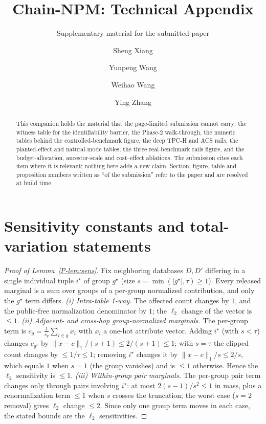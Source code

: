 \documentclass[sigconf, nonacm]{acmart}
\title{Chain-NPM: Technical Appendix}
\subtitle{Supplementary material for the submitted paper}
\author{Sheng Xiang}
\affiliation{%
  \institution{Tongji University}
}
\author{Yunpeng Wang}
\affiliation{%
  \institution{Tongji University}
}
\author{Weihao Wang}
\affiliation{%
  \institution{Tongji University}
}
\author{Ying Zhang}
\affiliation{%
  \institution{Zhejiang Gongshang University}
}
\newcommand{\pref}[1]{\ref{P-#1}}
\begin{document}
\begin{abstract}
This companion holds the material that the page-limited submission cannot
carry: the witness table for the identifiability barrier, the Phase-2
walk-through, the numeric tables behind the controlled-benchmark figure, the
deep TPC-H and ACS rails, the planted-effect and natural-mode tables, the
three real-benchmark rails figure, and the budget-allocation, ancestor-scale
and cost--effect ablations.  The submission cites each item where it is
relevant; nothing here adds a new claim.  Section, figure, table and
proposition numbers written as ``of the submission'' refer to the paper and
are resolved at build time.
\end{abstract}

\maketitle

\section{Sensitivity constants and total-variation statements}
\label{app:proofs}

\begin{proof}[Proof of Lemma~\pref{lem:sens}]
Fix neighboring databases $D,D'$ differing in a single individual tuple
$i^\star$ of group $g^\star$ (size $s=\min(|g^\star|,\tau)\ge1$). Every
released marginal is a sum over groups of a per-group normalized
contribution, and only the $g^\star$ term differs.
\emph{(i) Intra-table 1-way.} The affected count changes by $1$, and the
public-free normalization denominator by $1$; the $\ell_2$ change of the
vector is $\le1$.
\emph{(ii) Adjacent- and cross-hop group-normalized marginals.} The
per-group term is $c_g=\frac{1}{s_g}\sum_{i\in g}x_i$ with $x_i$ a one-hot
attribute vector. Adding $i^\star$ (with $s<\tau$) changes $c_{g^\star}$ by
$\|x-c\|_1/(s+1)\le2/(s+1)\le1$; with $s=\tau$ the clipped count changes by
$\le1/\tau\le1$; removing $i^\star$ changes it by $\|x-c\|_1/s\le2/s$, which
equals $1$ when $s=1$ (the group vanishes) and is $\le1$ otherwise. Hence
the $\ell_2$ sensitivity is $\le1$.
\emph{(iii) Within-group pair marginals.} The per-group pair term changes
only through pairs involving $i^\star$: at most $2(s-1)/s^2\le1$ in mass,
plus a renormalization term $\le1$ when $s$ crosses the truncation; the
worst case ($s=2$ removal) gives $\ell_2$ change $\le2$.
Since only one group term moves in each case, the stated bounds are the
$\ell_2$ sensitivities.
\end{proof}
\end{document}
